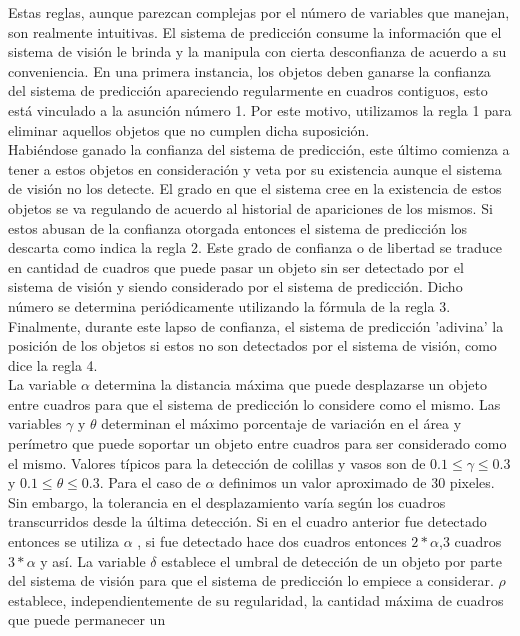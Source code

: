 Estas reglas, aunque parezcan complejas por el número de variables que 
manejan, son realmente intuitivas. El sistema de predicción consume la 
información que el sistema de visión le brinda y la manipula con 
cierta desconfianza de acuerdo a su 
conveniencia. En una primera instancia, los objetos deben ganarse la 
confianza del sistema de predicción apareciendo regularmente en 
cuadros contiguos, esto está vinculado a la asunción número 
1. Por este motivo, utilizamos la regla 1 para eliminar aquellos objetos que 
no cumplen dicha suposición. \\
	Habiéndose ganado la confianza del sistema de predicción, este 
	último comienza a tener a estos objetos en consideración y veta por su 
existencia aunque el sistema de visión no los detecte. El grado en que 
el sistema cree en la existencia de estos objetos se va regulando de 
acuerdo al historial de apariciones de los mismos. Si estos abusan de 
la confianza otorgada entonces el sistema de predicción los descarta 
como indica la regla 2. 
Este grado de confianza o de libertad se traduce en cantidad de 
cuadros que puede pasar un objeto sin ser detectado por el sistema de 
visión y siendo considerado por el sistema de predicción. Dicho 
número se determina periódicamente utilizando la fórmula de la regla 3.
Finalmente, durante este lapso de confianza, el sistema de predicción 
'adivina' la posición de los objetos si estos no son detectados por el 
sistema de visión, como dice la regla 4. \\
\indent La variable $\alpha$ determina la distancia máxima que puede 
desplazarse un objeto entre cuadros para que el sistema de predicción lo considere 
como el mismo. Las variables $\gamma$ y $\theta$ determinan el máximo 
porcentaje de variación en el área y perímetro que puede soportar un 
objeto entre cuadros para ser considerado como el mismo. Valores 
típicos para la detección de colillas y vasos son de 
$0.1\leq\gamma\leq0.3$ y $0.1\leq\theta\leq0.3$. Para el caso de 
$\alpha$ definimos un valor aproximado de 30 pixeles. Sin embargo, la 
tolerancia en el desplazamiento varía según los cuadros transcurridos desde la última 
detección. Si en el cuadro anterior fue detectado entonces se utiliza 
$\alpha$ , si fue detectado hace dos cuadros entonces $2*\alpha$,3 
cuadros $3*\alpha$ y así. La variable $\delta$ establece el umbral de 
detección de un objeto por parte del sistema de visión para que el 
sistema de predicción lo empiece  a considerar. $\rho$ establece, independientemente de su 
regularidad, la cantidad máxima de cuadros que puede permanecer un 
